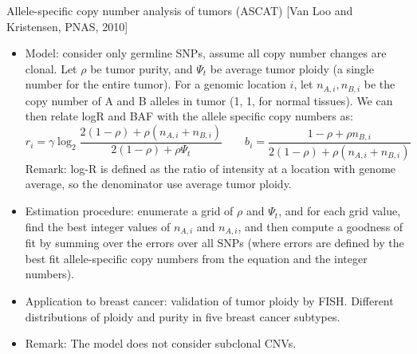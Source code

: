 \documentclass{report}
\begin{document}
Allele-specific copy number analysis of tumors (ASCAT) [Van Loo and Kristensen, PNAS, 2010]
\begin{itemize}
	\item Model: consider only germline SNPs, assume all copy number changes are clonal. Let $\rho$ be tumor purity, and $\Psi_t$ be average tumor ploidy (a single number for the entire tumor). For a genomic location $i$, let $n_{A,i}, n_{B,i}$ be the copy number of A and B alleles in tumor (1, 1, for normal tissues). We can then relate logR and BAF with the allele specific copy numbers as: 
	\begin{equation}
		r_i = \gamma \log_2 \frac{2(1-\rho)+\rho(n_{A,i}+n_{B,i})}{2(1-\rho) +\rho \Psi_t} \qquad b_i = \frac{1-\rho + \rho n_{B,i}}{2(1-\rho)+\rho(n_{A,i}+n_{B,i})}
	\end{equation}
	Remark: log-R is defined as the ratio of intensity at a location with genome average, so the denominator use average tumor ploidy.  
	
	\item Estimation procedure: enumerate a grid of $\rho$ and $\Psi_t$, and for each grid value, find the best integer values of $n_{A,i}$ and $n_{A,i}$, and then compute a goodness of fit by summing over the errors over all SNPs (where errors are defined by the best fit allele-specific copy numbers from the equation and the integer numbers). 
	
	\item Application to breast cancer: validation of tumor ploidy by FISH. Different distributions of ploidy and purity in five breast cancer subtypes. 
	
	\item Remark: The model does not consider subclonal CNVs. 
\end{itemize}
\end{document}
